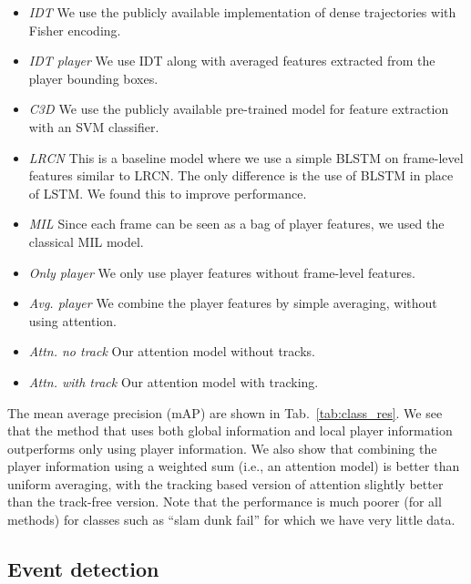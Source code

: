 \begin{itemize}
  \item \emph{IDT\cite{Wang_CVPR11}} We use the publicly available implementation of dense trajectories with
  Fisher encoding.
  
  \item \emph{IDT\cite{Wang_CVPR11} player} We use IDT along with averaged features extracted from the player
  bounding boxes.

  \item \emph{C3D \cite{Tran_arxiv14}} We use the publicly available pre-trained model for feature extraction
  with an SVM classifier.

  \item \emph{LRCN \cite{Donahue_arxiv14}} This is a baseline model where we use a simple BLSTM on frame-level features similar
  to LRCN. The only difference is the use of BLSTM in place of LSTM. We found this to improve
  performance.

  \item \emph{MIL \cite{}} Since each frame can be seen as a bag of player features, we used the
  classical MIL model. 

  \item \emph{Only player} We only use player features without frame-level
  features.
 
  \item \emph{Avg. player} We combine the player features by simple averaging, without
using  attention.

  \item \emph{Attn. no track} Our attention model without tracks.

  \item \emph{Attn. with track} Our attention model with tracking.
\end{itemize}

The mean average precision (mAP)
are shown in Tab.~\ref{tab:class_res}. We see that the method that
uses both global information and local player information outperforms
only using player information. We also show that combining the player
information using a weighted sum (i.e., an attention model) is better
than uniform averaging, with the tracking based version of attention
slightly better than the track-free version.
Note that the performance is much poorer (for all methods) for classes
such as ``slam dunk fail'' for which we have very little data.


\subsection{Event detection}

